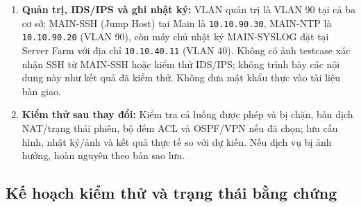 \begin{enumerate}
    \item \textbf{Quản trị, IDS/IPS và ghi nhật ký:} VLAN quản trị là VLAN 90 tại cả ba cơ sở; MAIN-SSH (Jump Host) tại Main là \texttt{10.10.90.30}, MAIN-NTP là \texttt{10.10.90.20} (VLAN 90), còn máy chủ nhật ký MAIN-SYSLOG đặt tại Server Farm với địa chỉ \texttt{10.10.40.11} (VLAN 40). Không có ảnh testcase xác nhận SSH từ MAIN-SSH hoặc kiểm thử IDS/IPS; không trình bày các nội dung này như kết quả đã kiểm thử. Không đưa mật khẩu thực vào tài liệu bàn giao.
    \item \textbf{Kiểm thử sau thay đổi:} Kiểm tra cả luồng được phép và bị chặn, bản dịch NAT/trạng thái phiên, bộ đếm ACL và OSPF/VPN nếu đã chọn; lưu cấu hình, nhật ký/ảnh và kết quả thực tế so với dự kiến. Nếu dịch vụ bị ảnh hưởng, hoàn nguyên theo bản sao lưu.
\end{enumerate}

\subsection{Kế hoạch kiểm thử và trạng thái bằng chứng}
\label{sec:security_test_evidence}

